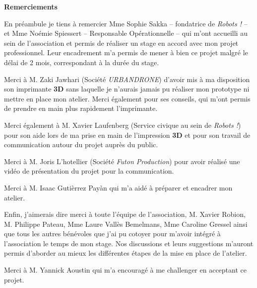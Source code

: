 \documentclass[12pt,titlepage]{article}
\numberwithin{figure}{subsubsection} %
\numberwithin{table}{subsubsection}
\begin{document}
\printnomenclature

\newpage

\begin{flushleft}
    \textbf{\LARGE Remerciements}
\end{flushleft}

\vspace{1cm}
En préambule je tiens à remercier Mme Sophie Sakka -- fondatrice de \textit{Robots !} -- et Mme Noémie Spiessert -- Responsable Opérationnelle -- qui m'ont accueilli au sein de l'association et permis de réaliser un stage en accord avec mon projet professionnel. Leur encadrement m'a permis de mener à bien ce projet malgré le délai de 2 mois, correspondant à la durée du stage. 

\vspace{0.5cm}
Merci à M. Zaki Jawhari (Société \textit{URBANDRONE}) d'avoir mis à ma disposition son imprimante \textbf{3D} sans laquelle je n'aurais jamais pu réaliser mon prototype ni mettre en place mon atelier. Merci également pour ses conseils, qui m'ont permis de prendre en main plus rapidement l'imprimante.

\vspace{0.5cm}
Merci également à M. Xavier Laufenberg (Service civique au sein de \textit{Robots !}) pour son aide lors de ma prise en main de l'impression \textbf{3D} et pour son travail de communication autour du projet auprès du public.

\vspace{0.5cm}
Merci à M. Joris L'hotellier (Société \textit{Futon Production}) pour avoir réalisé une vidéo de présentation du projet pour la communication.

\vspace{0.5cm}
Merci à M. Isaac Gutièrrez Payàn qui m'a aidé à préparer et encadrer mon atelier. 

\vspace{0.5cm}
Enfin, j'aimerais dire merci à toute l'équipe de l'association, M. Xavier Robion, M. Philippe Pateau, Mme Laure Vallès Bemelmans, Mme Caroline Gressel ainsi que tous les autres bénévoles que j'ai pu cotoyer pour m'avoir intégré à l'association le temps de mon stage. Nos discussions et leurs suggestions m'auront permis d'aborder au mieux les différentes étapes de la mise en place de l'atelier.

\vspace{0.5cm}
Merci à M. Yannick Aoustin qui m'a encouragé à me challenger en acceptant ce projet. 
\end{document}
